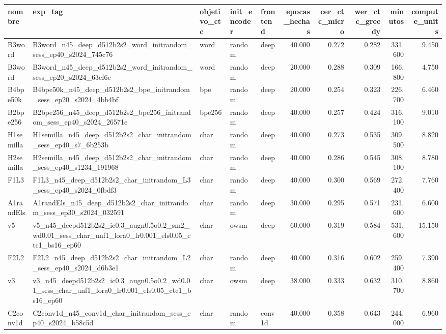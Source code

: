 \begin{tabular}{lllllrrrrr}
\toprule
nombre & exp_tag & objetivo_ctc & init_encoder & frontend & epocas_hechas & cer_ctc_micro & wer_ctc_greedy & minutos & compute_units \\
\midrule
B3word & B3word_n45_deep_d512b2s2_word_initrandom_sess_ep40_s2024_745c76 & word & random & deep & 40.000 & 0.272 & 0.282 & 331.600 & 9.450 \\
B3word & B3word_n45_deep_d512b2s2_word_initrandom_sess_ep20_s2024_63ef6e & word & random & deep & 20.000 & 0.288 & 0.309 & 166.800 & 4.750 \\
B4bpe50k & B4bpe50k_n45_deep_d512b2s2_bpe_initrandom_sess_ep20_s2024_4bb4bf & bpe & random & deep & 20.000 & 0.254 & 0.323 & 226.700 & 6.460 \\
B2bpe256 & B2bpe256_n45_deep_d512b2s2_bpe256_initrandom_sess_ep40_s2024_26571e & bpe256 & random & deep & 40.000 & 0.257 & 0.424 & 316.100 & 9.010 \\
H1semilla & H1semilla_n45_deep_d512b2s2_char_initrandom_sess_ep40_s7_6b253b & char & random & deep & 40.000 & 0.273 & 0.535 & 309.500 & 8.820 \\
H2semilla & H2semilla_n45_deep_d512b2s2_char_initrandom_sess_ep40_s1234_191968 & char & random & deep & 40.000 & 0.286 & 0.545 & 308.100 & 8.780 \\
F1L3 & F1L3_n45_deep_d512b2s2_char_initrandom_L3_sess_ep40_s2024_0fbdf3 & char & random & deep & 40.000 & 0.300 & 0.569 & 272.400 & 7.760 \\
A1randEls & A1randEls_n45_deep_d512b2s2_char_initrandom_sess_ep30_s2024_032591 & char & random & deep & 30.000 & 0.295 & 0.571 & 231.600 & 6.600 \\
v5 & v5_n45_deepd512b2s2_ic0.3_augn0.5o0.2_sm2_wd0.01_sess_char_unf1_lora0_lr0.001_els0.05_ctc1_bs16_ep60 & char & owsm & deep & 60.000 & 0.319 & 0.584 & 531.600 & 15.150 \\
F2L2 & F2L2_n45_deep_d512b2s2_char_initrandom_L2_sess_ep40_s2024_d6b3e1 & char & random & deep & 40.000 & 0.316 & 0.602 & 259.400 & 7.390 \\
v3 & v3_n45_deepd512b2s2_ic0.3_augn0.5o0.2_wd0.01_sess_char_unf1_lora0_lr0.001_els0.05_ctc1_bs16_ep60 & char & owsm & deep & 38.000 & 0.333 & 0.632 & 310.700 & 8.860 \\
C2conv1d & C2conv1d_n45_conv1d_char_initrandom_sess_ep40_s2024_b58c5d & char & random & conv1d & 40.000 & 0.358 & 0.643 & 244.000 & 6.960 \\
\bottomrule
\end{tabular}
